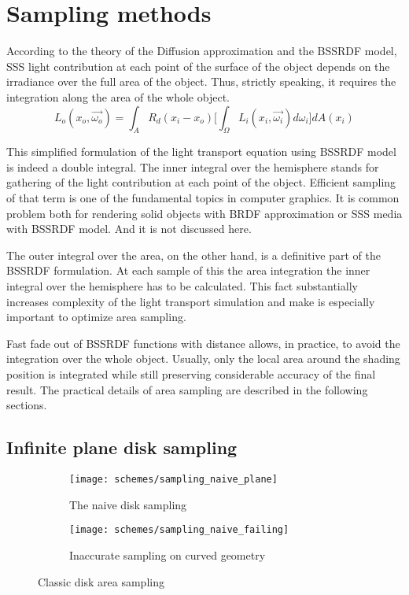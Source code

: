 \section{Sampling methods}
\label{sampling_methods}

According to the theory of the Diffusion approximation and the BSSRDF model, SSS light
contribution at each point of the surface of the object depends on the irradiance over the full area
of the object. Thus, strictly speaking, it requires the integration along the area of the whole
object.
\[
L_o(x_o, \vec{\omega_o})= \int_{A} R_d(x_i-x_o) \Bigg[ \int_{\Omega}
L_i(x_i,\vec{\omega_i})d\omega_i \Bigg] dA(x_i)
\]

This simplified formulation of the light transport equation using BSSRDF model is indeed a double
integral.
The inner integral over the hemisphere stands for gathering of the light contribution at each point
of the object. Efficient sampling of that term is one of the fundamental topics in computer
graphics. It is common problem both for rendering solid objects with BRDF approximation or SSS media
with BSSRDF model. And it is not discussed here.

The outer integral over the area, on the other hand, is a definitive part of the BSSRDF formulation.
At each sample of this the area integration the inner integral over the hemisphere has to be
calculated. This fact substantially increases complexity of the light transport simulation and make
is especially important to optimize area sampling.

Fast fade out of BSSRDF functions with distance allows, in practice, to avoid the integration over
the whole object. Usually, only the local area around the shading position is integrated while still
preserving considerable accuracy of the final result. The practical details of area sampling are
described in the following sections.

\subsection{Infinite plane disk sampling}
\label{subsection:sampling_simple_disk}
\begin{figure}[h]
    \centering
    \begin{subfigure}{0.45\textwidth}
        \texttt{[image: schemes/sampling\_naive\_plane]}
        \caption{The naive disk sampling}
        \label{fig:sampling_naive}
    \end{subfigure}
    \quad
    \begin{subfigure}{0.45\textwidth}
        \texttt{[image: schemes/sampling\_naive\_failing]}
        \caption{Inaccurate sampling on curved geometry}
    \end{subfigure}
    \caption{Classic disk area sampling}
    \label{fig:sampling_naive_fails}
\end{figure}

